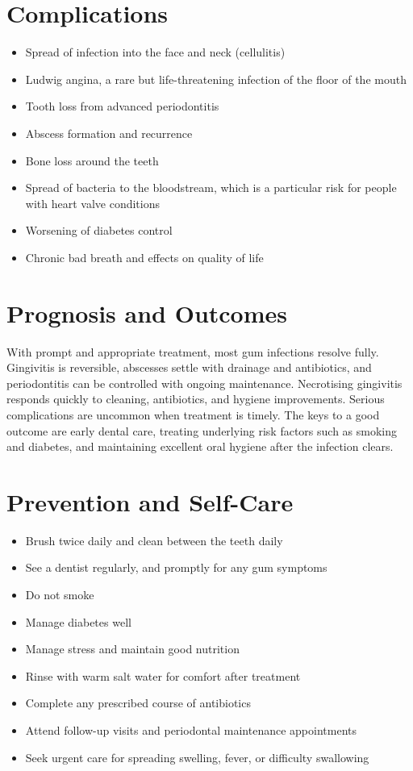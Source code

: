 \section*{Complications}
\begin{itemize}
    \item Spread of infection into the face and neck (cellulitis)
    \item Ludwig angina, a rare but life-threatening infection of the floor of the mouth
    \item Tooth loss from advanced periodontitis
    \item Abscess formation and recurrence
    \item Bone loss around the teeth
    \item Spread of bacteria to the bloodstream, which is a particular risk for people with heart valve conditions
    \item Worsening of diabetes control
    \item Chronic bad breath and effects on quality of life
\end{itemize}

\section*{Prognosis and Outcomes}
With prompt and appropriate treatment, most gum infections resolve fully. Gingivitis is reversible, abscesses settle with drainage and antibiotics, and periodontitis can be controlled with ongoing maintenance. Necrotising gingivitis responds quickly to cleaning, antibiotics, and hygiene improvements. Serious complications are uncommon when treatment is timely. The keys to a good outcome are early dental care, treating underlying risk factors such as smoking and diabetes, and maintaining excellent oral hygiene after the infection clears.

\section*{Prevention and Self-Care}
\begin{itemize}
    \item Brush twice daily and clean between the teeth daily
    \item See a dentist regularly, and promptly for any gum symptoms
    \item Do not smoke
    \item Manage diabetes well
    \item Manage stress and maintain good nutrition
    \item Rinse with warm salt water for comfort after treatment
    \item Complete any prescribed course of antibiotics
    \item Attend follow-up visits and periodontal maintenance appointments
    \item Seek urgent care for spreading swelling, fever, or difficulty swallowing
\end{itemize}

